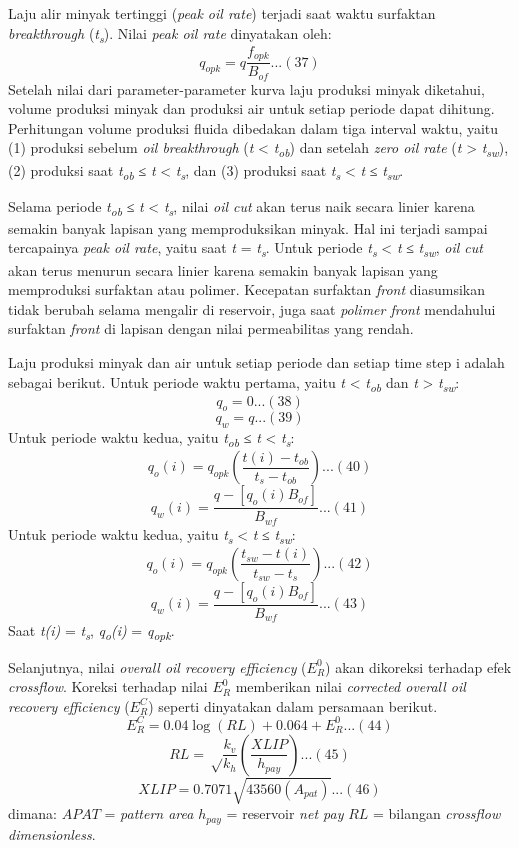 \documentclass[
]{book}
\begin{document}
Laju alir minyak tertinggi (\emph{peak oil rate}) terjadi saat waktu surfaktan \emph{breakthrough} (\emph{t\textsubscript{s}}). Nilai \emph{peak oil rate} dinyatakan oleh:
\[q_{opk} =q \frac{f_{opk}}{B_{of}}...(37)\]
Setelah nilai dari parameter-parameter kurva laju produksi minyak diketahui, volume produksi minyak dan produksi air untuk setiap periode dapat dihitung. Perhitungan volume produksi fluida dibedakan dalam tiga interval waktu, yaitu (1) produksi sebelum \emph{oil breakthrough} (\emph{t} \textless{} \emph{t\textsubscript{ob}}) dan setelah \emph{zero oil rate} (\emph{t} \textgreater{} \emph{t\textsubscript{sw}}), (2) produksi saat \emph{t\textsubscript{ob}} ≤ \emph{t} \textless{} \emph{t\textsubscript{s}}, dan (3) produksi saat \emph{t\textsubscript{s}} \textless{} \emph{t} ≤ \emph{t\textsubscript{sw}}.

Selama periode \emph{t\textsubscript{ob}} ≤ \emph{t} \textless{} \emph{t\textsubscript{s}}, nilai \emph{oil cut} akan terus naik secara linier karena semakin banyak lapisan yang memproduksikan minyak. Hal ini terjadi sampai tercapainya \emph{peak oil rate}, yaitu saat \emph{t} = \emph{t\textsubscript{s}}. Untuk periode \emph{t\textsubscript{s}} \textless{} \emph{t} ≤ \emph{t\textsubscript{sw}}, \emph{oil cut} akan terus menurun secara linier karena semakin banyak lapisan yang memproduksi surfaktan atau polimer. Kecepatan surfaktan \emph{front} diasumsikan tidak berubah selama mengalir di reservoir, juga saat \emph{polimer front} mendahului surfaktan \emph{front} di lapisan dengan nilai permeabilitas yang rendah.

Laju produksi minyak dan air untuk setiap periode dan setiap time step i adalah sebagai berikut. Untuk periode waktu pertama, yaitu \emph{t} \textless{} \emph{t\textsubscript{ob}} dan \emph{t} \textgreater{} \emph{t\textsubscript{sw}}:
\[q_o=0...(38)\]
\[q_w=q...(39)\]
Untuk periode waktu kedua, yaitu \emph{t\textsubscript{ob}} ≤ \emph{t} \textless{} \emph{t\textsubscript{s}}:
\[q_o(i)=q_{opk} \left( \frac{t(i)-t_{ob}}{t_s-t_{ob}} \right)...(40)\]
\[q_w(i)=\frac{q-[q_o(i)B_{of}]}{B_{wf}}...(41)\]
Untuk periode waktu kedua, yaitu \emph{t\textsubscript{s}} \textless{} \emph{t} ≤ \emph{t\textsubscript{sw}}:
\[q_o(i)=q_{opk} \left( \frac{t_{sw}-t(i)}{t_{sw}-t_s} \right)...(42)\]
\[q_w(i)=\frac{q-[q_o(i)B_{of}]}{B_{wf}}...(43)\]
Saat \emph{t(i)} = \emph{t\textsubscript{s}}, \emph{q\textsubscript{o}(i)} = \emph{q\textsubscript{opk}}.

Selanjutnya, nilai \emph{overall oil recovery efficiency} (\(E_R^0\)) akan dikoreksi terhadap efek \emph{crossflow}. Koreksi terhadap nilai \(E_R^0\) memberikan nilai \emph{corrected overall oil recovery efficiency} (\(E_R^C\)) seperti dinyatakan dalam persamaan berikut.
\[E_R^C= 0.04 \log (RL) + 0.064+E_R^0...(44)\]
\[RL = \sqrt \frac{k_v}{k_h} \left( \frac{XLIP}{h_{pay}} \right)...(45)\]
\[XLIP = 0.7071 \sqrt {43560(A_{pat})}...(46)\]
dimana:
\(APAT\) = \emph{pattern area}
\(h_{pay}\) = reservoir \emph{net pay}
\(RL\) = bilangan \emph{crossflow dimensionless}.
\end{document}
